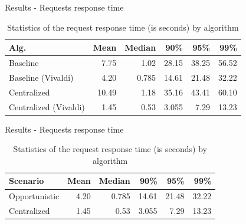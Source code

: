 \documentclass[Ligatures=TeX,table,svgnames,usetotalslideindicator,compress,10pt,aspectratio=169]{beamer}
\begin{document}
\appendix
\begin{frame}{Results - Requests response time}

\begin{table}[h]
  
  \caption{Statistics of the request response time (is seconds) by algorithm }\label{tab:dcutilization} \centering

  \begin{tabular}{|l|r|r|r|r|r|}
   \hline
    
   \textbf{Alg.} &   \textbf{Mean} & \textbf{Median} & \textbf{90\%} & \textbf{95\%}& \textbf{99\%} \\
  \hline
  Baseline  & 7.75 & 1.02  & 28.15 & 38.25 & 56.52 \\
  \hline
  Baseline (Vivaldi)  & 4.20  & 0.785  & 14.61 & 21.48 &  32.22 \\
  \hline
  Centralized  & 10.49 & 1.18  & 35.16 & 43.41 & 60.10 \\
  \hline
  Centralized (Vivaldi)  & 1.45  & 0.53  & 3.055 & 7.29 &  13.23 \\
  \hline
  
\end{tabular}  
\end{table}
    \end{frame}

\begin{frame}{Results - Requests response time}

\begin{table}[h]
  
  \caption{Statistics of the request response time (is seconds) by algorithm }\label{tab:dcutilization} \centering

  \begin{tabular}{|l|r|r|r|r|r|}
   \hline
    
   \textbf{Scenario} &   \textbf{Mean} & \textbf{Median} & \textbf{90\%} & \textbf{95\%}& \textbf{99\%} \\
  \hline
  Opportunistic & 4.20  & 0.785  & 14.61 & 21.48 &  32.22 \\
  \hline
  Centralized  & 1.45  & 0.53  & 3.055 & 7.29 &  13.23 \\
  \hline
  
\end{tabular}  
\end{table}
    \end{frame}
\end{document}
